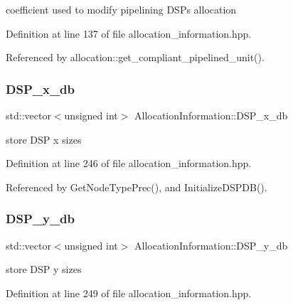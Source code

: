 coefficient used to modify pipelining D\+S\+Ps allocation 



Definition at line 137 of file allocation\+\_\+information.\+hpp.



Referenced by allocation\+::get\+\_\+compliant\+\_\+pipelined\+\_\+unit().

\mbox{\label{classAllocationInformation_a04bdbd182db9e4ca294b7875c5360937}} 
\subsubsection{\texorpdfstring{D\+S\+P\+\_\+x\+\_\+db}{DSP\_x\_db}}
{\footnotesize\ttfamily std\+::vector$<$unsigned int$>$ Allocation\+Information\+::\+D\+S\+P\+\_\+x\+\_\+db\hspace{0.3cm}{\ttfamily [private]}}



store D\+SP x sizes 



Definition at line 246 of file allocation\+\_\+information.\+hpp.



Referenced by Get\+Node\+Type\+Prec(), and Initialize\+D\+S\+P\+D\+B().

\mbox{\label{classAllocationInformation_aaecec7f461722fd6482afd446401d436}} 
\subsubsection{\texorpdfstring{D\+S\+P\+\_\+y\+\_\+db}{DSP\_y\_db}}
{\footnotesize\ttfamily std\+::vector$<$unsigned int$>$ Allocation\+Information\+::\+D\+S\+P\+\_\+y\+\_\+db\hspace{0.3cm}{\ttfamily [private]}}



store D\+SP y sizes 



Definition at line 249 of file allocation\+\_\+information.\+hpp.



